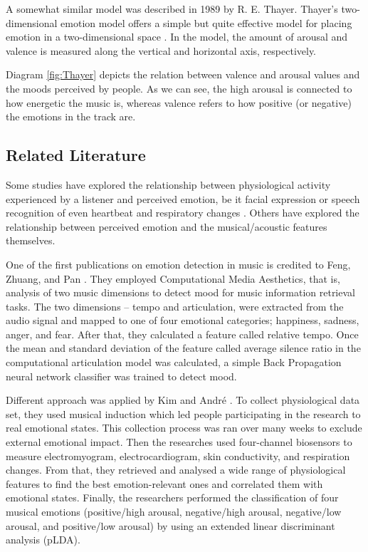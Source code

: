 A somewhat similar model was described in 1989 by R. E. Thayer. Thayer’s two-dimensional emotion model offers a simple but quite effective model for placing emotion in a two-dimensional space \cite{Thayer}. In the model, the amount of arousal and valence is measured along the vertical and horizontal axis, respectively.

Diagram \ref{fig:Thayer} depicts the relation between valence and arousal values and the moods perceived by people. As we can see, the high arousal is connected to how energetic the music is, whereas valence refers to how positive (or negative) the emotions in the track are. 

\vspace{10pt}

\subsection{Related Literature}

Some studies have explored the relationship between physiological activity experienced by a listener and perceived emotion, be it facial expression or speech recognition of even heartbeat and respiratory changes \cite{physicalmood}.
Others have explored the relationship between perceived emotion and the musical/acoustic features themselves.

One of the first publications on emotion detection in music is credited to Feng, Zhuang, and Pan \cite{moodold}. They employed Computational Media Aesthetics, that is, analysis of two music dimensions to detect mood for music information retrieval tasks. The two dimensions -- tempo and articulation, were extracted from the audio signal and mapped to one of four emotional categories; happiness, sadness, anger, and fear. 
After that, they calculated a feature called relative tempo. Once the mean and standard deviation of the feature called average silence ratio in the computational articulation model was calculated, a simple Back Propagation neural network classifier was trained to detect mood.

Different approach was applied by Kim and Andr\'{e} \cite{physicalmood}. To collect physiological data set, they used musical induction which led people participating in the research to real emotional states. This collection process was ran over many weeks to exclude external emotional impact. Then the researches used four-channel biosensors to measure electromyogram, electrocardiogram, skin conductivity, and respiration changes. From that, they retrieved and analysed a wide range of physiological features to find the best emotion-relevant ones and correlated them with emotional states. Finally, the researchers performed the classification of four musical emotions (positive/high arousal, negative/high arousal, negative/low arousal, and positive/low arousal) by using an extended linear discriminant analysis (pLDA).

